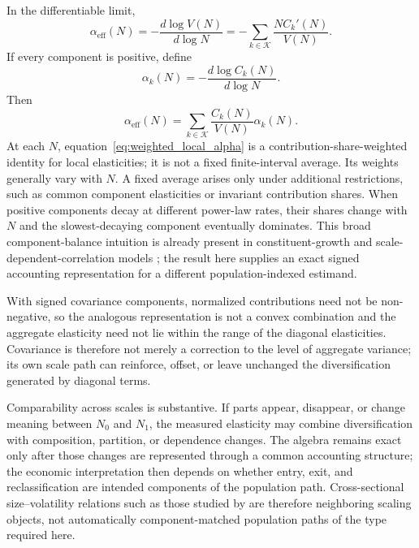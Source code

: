 {In the differentiable limit,
\begin{equation}
\label{eq:local_signed_decomposition}
    \alpha_{\mathrm{eff}}(N)
    =-
    \frac{d\log V(N)}{d\log N}
    =-
    \sum_{k\in\mathcal{K}}
    \frac{N C_k'(N)}{V(N)}.
\end{equation}
If every component is positive, define
\begin{equation}
    \alpha_k(N)
    =
    -\frac{d\log C_k(N)}{d\log N}.
\end{equation}
Then
\begin{equation}
\label{eq:weighted_local_alpha}
    \alpha_{\mathrm{eff}}(N)
    =
    \sum_{k\in\mathcal{K}}
    \frac{C_k(N)}{V(N)}\alpha_k(N).
\end{equation}
At each $N$, equation~\eqref{eq:weighted_local_alpha} is a
contribution-share-weighted identity for local elasticities; it is not a
fixed finite-interval average. Its weights generally vary with $N$. A
fixed average arises only under additional restrictions, such as common
component elasticities or invariant contribution shares. When positive
components decay at different power-law rates, their shares change with
$N$ and the slowest-decaying component eventually dominates. This broad
component-balance intuition is already present in constituent-growth and
scale-dependent-correlation models \citep{sutton2001,riccaboniEtAl2008,calvinoEtAl2018}; the result here supplies an exact signed accounting
representation for a different population-indexed estimand.

With signed covariance components, normalized contributions need not be
non-negative, so the analogous representation is not a convex
combination and the aggregate elasticity need not lie within the range
of the diagonal elasticities. Covariance is therefore not merely a
correction to the level of aggregate variance; its own scale path can
reinforce, offset, or leave unchanged the diversification generated by
diagonal terms.

Comparability across scales is substantive. If parts appear, disappear,
or change meaning between $N_0$ and $N_1$, the measured elasticity may
combine diversification with composition, partition, or dependence
changes. The algebra remains exact only after those changes are
represented through a common accounting structure; the economic
interpretation then depends on whether entry, exit, and reclassification
are intended components of the population path. Cross-sectional
size--volatility relations such as those studied by
\citet{sutton2001,bottazziSecchi2006,riccaboniEtAl2008,calvinoEtAl2018}
are therefore neighboring scaling objects, not automatically
component-matched population paths of the type required here.

}
